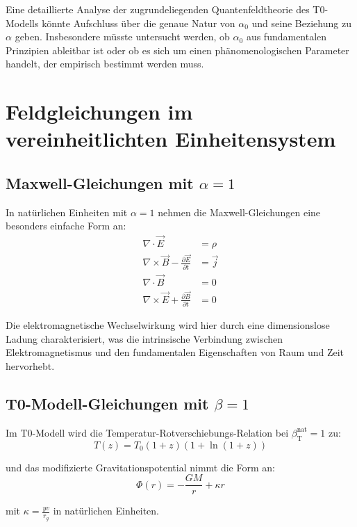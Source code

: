 \documentclass[12pt,a4paper]{article}
\newcommand{\betaT}{\beta_{\text{T}}}
\begin{document}
	Eine detaillierte Analyse der zugrundeliegenden Quantenfeldtheorie des T0-Modells könnte Aufschluss über die genaue Natur von \(\alpha_0\) und seine Beziehung zu \(\alpha\) geben. Insbesondere müsste untersucht werden, ob \(\alpha_0\) aus fundamentalen Prinzipien ableitbar ist oder ob es sich um einen phänomenologischen Parameter handelt, der empirisch bestimmt werden muss.
	
	\section{Feldgleichungen im vereinheitlichten Einheitensystem}
	
	\subsection{Maxwell-Gleichungen mit \(\alpha = 1\)}
	
	In natürlichen Einheiten mit \(\alpha = 1\) nehmen die Maxwell-Gleichungen eine besonders einfache Form an:
	\begin{align}
		\nabla \cdot \vec{E} &= \rho \\
		\nabla \times \vec{B} - \frac{\partial \vec{E}}{\partial t} &= \vec{j} \\
		\nabla \cdot \vec{B} &= 0 \\
		\nabla \times \vec{E} + \frac{\partial \vec{B}}{\partial t} &= 0
	\end{align}
	
	Die elektromagnetische Wechselwirkung wird hier durch eine dimensionslose Ladung charakterisiert, was die intrinsische Verbindung zwischen Elektromagnetismus und den fundamentalen Eigenschaften von Raum und Zeit hervorhebt.
	
	\subsection{T0-Modell-Gleichungen mit \(\beta = 1\)}
	
	Im T0-Modell wird die Temperatur-Rotverschiebungs-Relation bei \(\betaT^{\text{nat}} = 1\) zu:
	\begin{equation}
		T(z) = T_0 (1+z)(1+\ln(1+z))
	\end{equation}
	
	und das modifizierte Gravitationspotential nimmt die Form an:
	\begin{equation}
		\Phi(r) = -\frac{G M}{r} + \kappa r
	\end{equation}
	
	mit \(\kappa = \frac{y v}{r_g}\) in natürlichen Einheiten.
	
\end{document}
